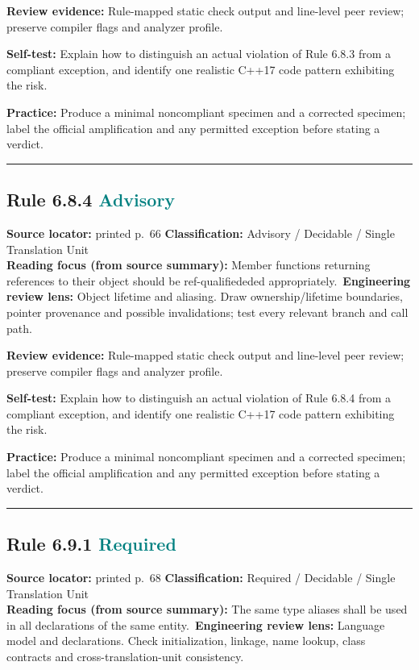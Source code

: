 \documentclass[10pt,letterpaper]{article}
\begin{document}
\textbf{Review evidence:} Rule-mapped static check output and line-level peer review; preserve compiler flags and analyzer profile.

\textbf{Self-test:} Explain how to distinguish an actual violation of Rule 6.8.3 from a compliant exception, and identify one realistic C++17 code pattern exhibiting the risk.\par
\textbf{Practice:} Produce a minimal noncompliant specimen and a corrected specimen; label the official amplification and any permitted exception before stating a verdict.
\smallskip\hrule\smallskip
\subsection*{Rule 6.8.4 \enspace \texorpdfstring{\small\textcolor{teal}{Advisory}}{Advisory}}
\noindent\textbf{Source locator:} printed p.~66 \quad\textbf{Classification:} Advisory / Decidable / Single Translation Unit\\
\textbf{Reading focus (from source summary):} Member functions returning references to their object should be ref-qualifiededed appropriately.\
\textbf{Engineering review lens:} Object lifetime and aliasing. Draw ownership/lifetime boundaries, pointer provenance and possible invalidations; test every relevant branch and call path.

\textbf{Review evidence:} Rule-mapped static check output and line-level peer review; preserve compiler flags and analyzer profile.

\textbf{Self-test:} Explain how to distinguish an actual violation of Rule 6.8.4 from a compliant exception, and identify one realistic C++17 code pattern exhibiting the risk.\par
\textbf{Practice:} Produce a minimal noncompliant specimen and a corrected specimen; label the official amplification and any permitted exception before stating a verdict.
\smallskip\hrule\smallskip
\subsection*{Rule 6.9.1 \enspace \texorpdfstring{\small\textcolor{teal}{Required}}{Required}}
\noindent\textbf{Source locator:} printed p.~68 \quad\textbf{Classification:} Required / Decidable / Single Translation Unit\\
\textbf{Reading focus (from source summary):} The same type aliases shall be used in all declarations of the same entity.\
\textbf{Engineering review lens:} Language model and declarations. Check initialization, linkage, name lookup, class contracts and cross-translation-unit consistency.
\end{document}
